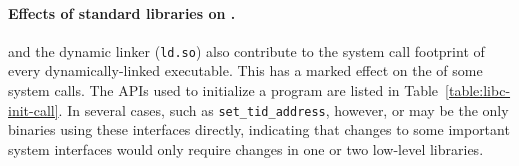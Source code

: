 



\paragraph{Effects of standard libraries on \usagemetric{}.} \Libc{} and the dynamic linker ({\tt ld.so}) 
also contribute to the system call footprint of every dynamically-linked executable.
This has a marked effect on the \usagemetric{} of some system calls.
The APIs used to initialize a program  are listed in Table~\ref{table:libc-init-call}.
In several cases, such as {\tt set\_tid\_address}, however, \libc{} or \libpthread{} may be the only binaries using these interfaces directly,
indicating that changes to some important system interfaces would only require changes in one or two low-level libraries.

